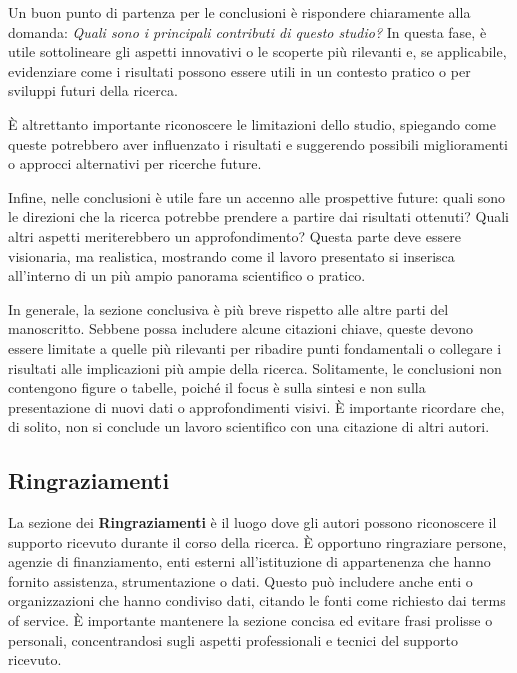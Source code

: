 \documentclass[9pt,a4paper,twoside]{rho-class/rho}
\begin{document}
Un buon punto di partenza per le conclusioni è rispondere chiaramente alla domanda: \textit{Quali sono i principali contributi di questo studio?} In questa fase, è utile sottolineare gli aspetti innovativi o le scoperte più rilevanti e, se applicabile, evidenziare come i risultati possono essere utili in un contesto pratico o per sviluppi futuri della ricerca.

È altrettanto importante riconoscere le limitazioni dello studio, spiegando come queste potrebbero aver influenzato i risultati e suggerendo possibili miglioramenti o approcci alternativi per ricerche future.

Infine, nelle conclusioni è utile fare un accenno alle prospettive future: quali sono le direzioni che la ricerca potrebbe prendere a partire dai risultati ottenuti? Quali altri aspetti meriterebbero un approfondimento? Questa parte deve essere visionaria, ma realistica, mostrando come il lavoro presentato si inserisca all’interno di un più ampio panorama scientifico o pratico.

In generale, la sezione conclusiva è più breve rispetto alle altre parti del manoscritto. Sebbene possa includere alcune citazioni chiave, queste devono essere limitate a quelle più rilevanti per ribadire punti fondamentali o collegare i risultati alle implicazioni più ampie della ricerca. Solitamente, le conclusioni non contengono figure o tabelle, poiché il focus è sulla sintesi e non sulla presentazione di nuovi dati o approfondimenti visivi. È importante ricordare che, di solito, non si conclude un lavoro scientifico con una citazione di altri autori.

\subsection{Ringraziamenti}
La sezione dei \textbf{Ringraziamenti} è il luogo dove gli autori possono riconoscere il supporto ricevuto durante il corso della ricerca. È opportuno ringraziare persone, agenzie di finanziamento, enti esterni all’istituzione di appartenenza che hanno fornito assistenza, strumentazione o dati. Questo può includere anche enti o organizzazioni che hanno condiviso dati, citando le fonti come richiesto dai terms of service. È importante mantenere la sezione concisa ed evitare frasi prolisse o personali, concentrandosi sugli aspetti professionali e tecnici del supporto ricevuto.
\end{document}
